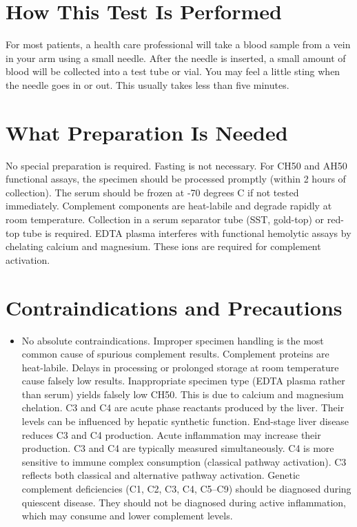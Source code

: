\section*{How This Test Is Performed}
For most patients, a health care professional will take a blood sample from a vein in your arm using a small needle. After the needle is inserted, a small amount of blood will be collected into a test tube or vial. You may feel a little sting when the needle goes in or out. This usually takes less than five minutes.

\section*{What Preparation Is Needed}
No special preparation is required. Fasting is not necessary. For CH50 and AH50 functional assays, the specimen should be processed promptly (within 2 hours of collection). The serum should be frozen at -70 degrees C if not tested immediately. Complement components are heat-labile and degrade rapidly at room temperature. Collection in a serum separator tube (SST, gold-top) or red-top tube is required. EDTA plasma interferes with functional hemolytic assays by chelating calcium and magnesium. These ions are required for complement activation.

\section*{Contraindications and Precautions}
\begin{itemize}
  \item No absolute contraindications. Improper specimen handling is the most common cause of spurious complement results. Complement proteins are heat-labile. Delays in processing or prolonged storage at room temperature cause falsely low results. Inappropriate specimen type (EDTA plasma rather than serum) yields falsely low CH50. This is due to calcium and magnesium chelation. C3 and C4 are acute phase reactants produced by the liver. Their levels can be influenced by hepatic synthetic function. End-stage liver disease reduces C3 and C4 production. Acute inflammation may increase their production. C3 and C4 are typically measured simultaneously. C4 is more sensitive to immune complex consumption (classical pathway activation). C3 reflects both classical and alternative pathway activation. Genetic complement deficiencies (C1, C2, C3, C4, C5--C9) should be diagnosed during quiescent disease. They should not be diagnosed during active inflammation, which may consume and lower complement levels.
\end{itemize}
